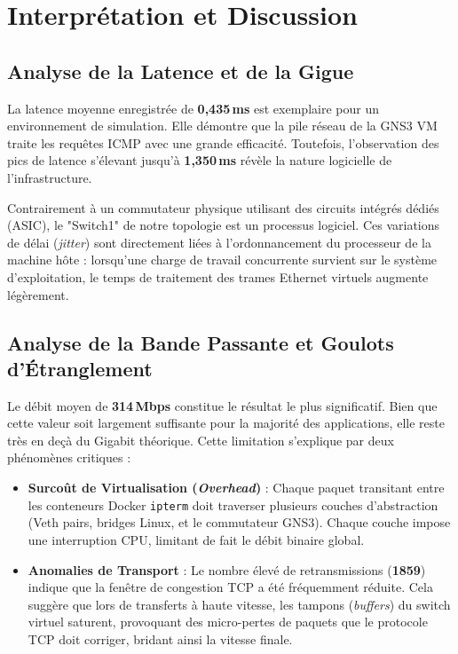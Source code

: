 \documentclass[11pt,a4paper,oneside]{report}
\begin{document}
\section{Interpr\'{e}tation et Discussion}

\subsection{Analyse de la Latence et de la Gigue}

La latence moyenne enregistr\'{e}e de \textbf{0,435\,ms} est exemplaire pour un environnement de simulation. Elle d\'{e}montre que la pile r\'{e}seau de la GNS3 VM traite les requ\^{e}tes ICMP avec une grande efficacit\'{e}. Toutefois, l'observation des pics de latence s'\'{e}levant jusqu'\`{a} \textbf{1,350\,ms} r\'{e}v\`{e}le la nature logicielle de l'infrastructure. 

Contrairement \`{a} un commutateur physique utilisant des circuits int\'{e}gr\'{e}s d\'{e}di\'{e}s (ASIC), le "Switch1" de notre topologie est un processus logiciel. Ces variations de d\'{e}lai (\textit{jitter}) sont directement li\'{e}es \`{a} l'ordonnancement du processeur de la machine h\^{o}te : lorsqu'une charge de travail concurrente survient sur le syst\`{e}me d'exploitation, le temps de traitement des trames Ethernet virtuels augmente l\'{e}g\`{e}rement.

\subsection{Analyse de la Bande Passante et Goulots d'\'{E}tranglement}

Le d\'{e}bit moyen de \textbf{314\,Mbps} constitue le r\'{e}sultat le plus significatif. Bien que cette valeur soit largement suffisante pour la majorit\'{e} des applications, elle reste tr\`{e}s en de\c{c}\`{a} du Gigabit th\'{e}orique. Cette limitation s'explique par deux ph\'{e}nom\`{e}nes critiques :

\begin{itemize}[leftmargin=*, itemsep=3pt]
    \item \textbf{Surco\^{u}t de Virtualisation (\textit{Overhead})} : Chaque paquet transitant entre les conteneurs Docker \texttt{ipterm} doit traverser plusieurs couches d'abstraction (Veth pairs, bridges Linux, et le commutateur GNS3). Chaque couche impose une interruption CPU, limitant de fait le d\'{e}bit binaire global.
    \item \textbf{Anomalies de Transport} : Le nombre \'{e}lev\'{e} de retransmissions (\textbf{1859}) indique que la fen\^{e}tre de congestion TCP a \'{e}t\'{e} fr\'{e}quemment r\'{e}duite. Cela sugg\`{e}re que lors de transferts \`{a} haute vitesse, les tampons (\textit{buffers}) du switch virtuel saturent, provoquant des micro-pertes de paquets que le protocole TCP doit corriger, bridant ainsi la vitesse finale.
\end{itemize}
\end{document}

